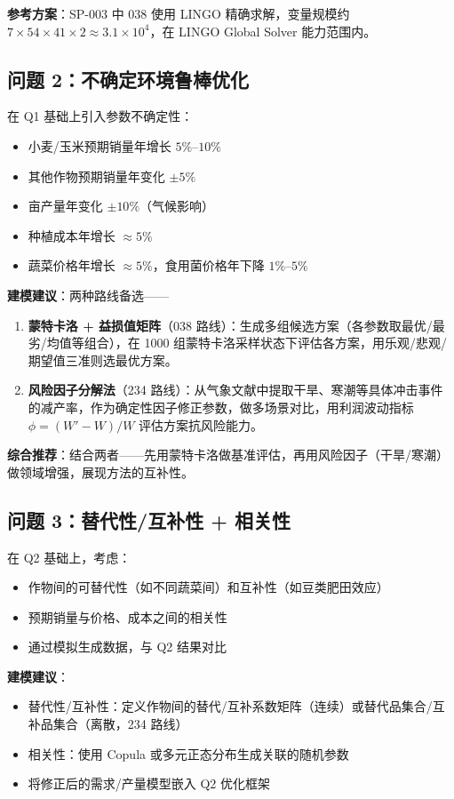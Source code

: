 \documentclass{internal-report}
\begin{document}
\textbf{参考方案}：SP-003 中 038 使用 LINGO 精确求解，变量规模约 $7 \times 54 \times 41 \times 2 \approx 3.1 \times 10^4$，在 LINGO Global Solver 能力范围内。

\subsection{问题 2：不确定环境鲁棒优化}

在 Q1 基础上引入参数不确定性：
\begin{itemize}
    \item 小麦/玉米预期销量年增长 $5\%$--$10\%$
    \item 其他作物预期销量年变化 $\pm 5\%$
    \item 亩产量年变化 $\pm 10\%$（气候影响）
    \item 种植成本年增长 $\approx 5\%$
    \item 蔬菜价格年增长 $\approx 5\%$，食用菌价格年下降 $1\%$--$5\%$
\end{itemize}

\textbf{建模建议}：两种路线备选——
\begin{enumerate}
    \item \textbf{蒙特卡洛 + 益损值矩阵}（038 路线）：生成多组候选方案（各参数取最优/最劣/均值等组合），在 1000 组蒙特卡洛采样状态下评估各方案，用乐观/悲观/期望值三准则选最优方案。
    \item \textbf{风险因子分解法}（234 路线）：从气象文献中提取干旱、寒潮等具体冲击事件的减产率，作为确定性因子修正参数，做多场景对比，用利润波动指标 $\phi = (W' - W)/W$ 评估方案抗风险能力。
\end{enumerate}

\textbf{综合推荐}：结合两者——先用蒙特卡洛做基准评估，再用风险因子（干旱/寒潮）做领域增强，展现方法的互补性。

\subsection{问题 3：替代性/互补性 + 相关性}

在 Q2 基础上，考虑：
\begin{itemize}
    \item 作物间的可替代性（如不同蔬菜间）和互补性（如豆类肥田效应）
    \item 预期销量与价格、成本之间的相关性
    \item 通过模拟生成数据，与 Q2 结果对比
\end{itemize}

\textbf{建模建议}：
\begin{itemize}
    \item 替代性/互补性：定义作物间的替代/互补系数矩阵（连续）或替代品集合/互补品集合（离散，234 路线）
    \item 相关性：使用 Copula 或多元正态分布生成关联的随机参数
    \item 将修正后的需求/产量模型嵌入 Q2 优化框架
\end{itemize}
\end{document}
